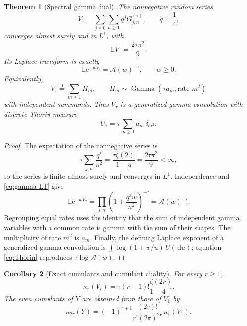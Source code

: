 \documentclass[11pt,oneside]{article}
\newtheorem{theorem}{Theorem}[section]
\newtheorem{corollary}[theorem]{Corollary}
\theoremstyle{definition}
\theoremstyle{remark}
\newcommand{\e}{\mathrm e}
\newcommand{\dd}{\,\mathrm d}
\newcommand{\E}{\mathbb E}
\newcommand{\dist}{\mathrel{\stackrel{\mathrm d}=}}
\begin{document}
\begin{theorem}[Spectral gamma dual]\label{thm:gamma-dual}
The nonnegative random series
\begin{equation}\label{eq:Vtau-layered}
 V_\tau=\sum_{j\ge0}\sum_{n\ge1}q^jG_{j,n}^{(\tau)},
 \qquad q=\frac14,
\end{equation}
converges almost surely and in $L^1$, with
\begin{equation}\label{eq:V-mean}
 \E V_\tau=\frac{2\tau\pi^2}{9}.
\end{equation}
Its Laplace transform is exactly
\begin{equation}\label{eq:V-LT}
 \boxed{\E\e^{-wV_\tau}=\mathcal A(w)^{-\tau}},\qquad w\ge0.
\end{equation}
Equivalently,
\begin{equation}\label{eq:V-grouped}
 V_\tau\dist\sum_{m\ge1}H_m,
 \qquad
 H_m\sim\operatorname{Gamma}(\tau a_m,\text{rate }m^2)
\end{equation}
with independent summands.  Thus $V_\tau$ is a generalized gamma convolution
with discrete Thorin measure
\begin{equation}\label{eq:Thorin}
 \boxed{U_\tau=\tau\sum_{m\ge1}a_m\,\delta_{m^2}.}
\end{equation}
\end{theorem}

\begin{proof}
The expectation of the nonnegative series is
\[
 \tau\sum_{j,n}\frac{q^j}{n^2}
 =\frac{\tau\zeta(2)}{1-q}=\frac{2\tau\pi^2}{9}<\infty,
\]
so the series is finite almost surely and converges in $L^1$.  Independence and
\cref{eq:gamma-LT} give
\[
 \E\e^{-wV_\tau}
 =\prod_{j,n}\left(1+\frac{q^jw}{n^2}\right)^{-\tau}
 =\mathcal A(w)^{-\tau}.
\]
Regrouping equal rates uses the identity that the sum of independent gamma
variables with a common rate is gamma with the sum of their shapes.  The
multiplicity of rate $m^2$ is $a_m$.  Finally, the defining Laplace exponent of
a generalized gamma convolution is
$\int\log(1+w/u)\,U(\dd u)$; equation \cref{eq:Thorin} reproduces
$\tau\log\mathcal A(w)$.
\end{proof}

\begin{corollary}[Exact cumulants and cumulant duality]\label{cor:V-cumulants}
For every $r\ge1$,
\begin{equation}\label{eq:V-cumulants}
 \boxed{
 \kappa_r(V_\tau)=\tau(r-1)!\frac{\zeta(2r)}{1-4^{-r}}.}
\end{equation}
The even cumulants of $Y$ are obtained from those of $V_1$ by
\begin{equation}\label{eq:cumulant-duality}
 \boxed{
 \kappa_{2r}(Y)=(-1)^{r+1}
 \frac{(2r)!}{r!(2\pi)^{2r}}\,\kappa_r(V_1).}
\end{equation}
\end{corollary}
\end{document}

